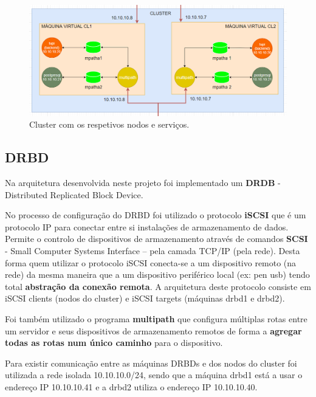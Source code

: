 \begin{figure}[H]
	\centering
	\includegraphics[scale=0.6]{imagens/cluster.PNG}
	\caption{Cluster com os respetivos nodos e serviços.}
\end{figure}



\subsection{DRBD} \label{subsec:drbd}

\hspace{5mm} Na arquitetura desenvolvida neste projeto foi implementado um \textbf{DRDB} - Distributed Replicated Block Device.

\hspace{5mm} No processo de configuração do DRBD foi utilizado o protocolo \textbf{iSCSI} que é um protocolo IP para conectar entre si instalações de armazenamento de dados. Permite o controlo de dispositivos de armazenamento através de comandos \textbf{SCSI} - Small Computer Systems Interface – pela camada TCP/IP (pela rede). Desta forma quem utilizar o protocolo iSCSI conecta-se a um dispositivo remoto (na rede) da mesma maneira que a um dispositivo periférico local (ex: pen usb) tendo total \textbf{abstração da conexão remota}. A arquitetura deste protocolo consiste em iSCSI clients (nodos do cluster) e iSCSI targets (máquinas drbd1 e drbd2).

\hspace{5mm} Foi também utilizado o programa \textbf{multipath} que configura múltiplas rotas entre um servidor e seus dispositivos de armazenamento remotos de forma a \textbf{agregar todas as rotas num único caminho} para o dispositivo.

\hspace{5mm} Para existir comunicação entre as máquinas DRBDs e dos nodos do cluster foi utilizada a rede isolada 10.10.10.0/24, sendo que a máquina drbd1 está a usar o endereço IP 10.10.10.41 e a drbd2 utiliza o endereço IP 10.10.10.40.

